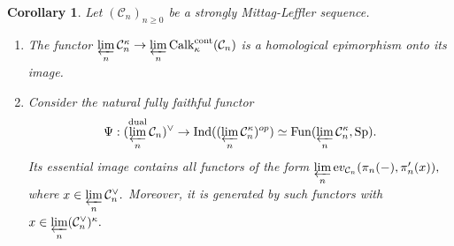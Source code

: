 \documentclass[11pt,leqno]{amsart}
\newtheorem{cor}[theo]{Corollary}
\numberwithin{equation}{section}
\newcommand{\prolim}[1][]{\mathop{\varprojlim}\limits_{#1}}
\newcommand{\cont}{\operatorname{cont}}
\newcommand{\dual}{\operatorname{dual}}
\newcommand{\ev}{\mathrm ev}
\newcommand{\cC}{{\mathcal C}}
\newcommand{\Fun}{\operatorname{Fun}}
\newcommand{\Sp}{\operatorname{Sp}}
\newcommand{\Ind}{\operatorname{Ind}}
\newcommand{\Calk}{\operatorname{Calk}}
\begin{document}
\begin{cor}\label{cor:hom_epi_onto_the_image_ML}
Let $(\cC_n)_{n\geq 0}$ be a strongly Mittag-Leffler sequence.
\begin{enumerate}[label=(\roman*),ref=(\roman*)]
\item The functor $\prolim[n]\cC_n^{\kappa}\to\prolim[n]\Calk_{\kappa}^{\cont}(\cC_n)$ is a homological epimorphism onto its image. \label{hom_epi_onto_image_ML}

\item Consider the natural fully faithful functor
\begin{equation}\label{eq:incl_of_dual_of_lim_dual}
\Psi:(\prolim[n]^{\dual}\cC_n)^{\vee}\to \Ind((\prolim[n]\cC_n^{\kappa})^{op})\simeq \Fun(\prolim[n]\cC_n^{\kappa},\Sp).
\end{equation}
Its essential image contains all functors of the form $\prolim[n]\ev_{\cC_n}(\pi_n(-),\pi_n^\prime(x)),$ where $x\in\prolim[n]\cC_n^{\vee}.$ Moreover, it is generated by such functors with $x\in\prolim[n](\cC_n^{\vee})^{\kappa}.$ \label{dual_of_dualizable_limit}
\end{enumerate}
\end{cor}
\end{document}
